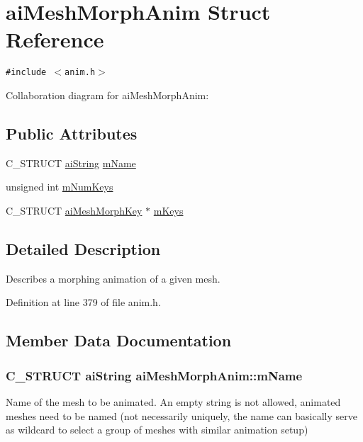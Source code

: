 \hypertarget{structai_mesh_morph_anim}{
\section{aiMeshMorphAnim Struct Reference}
\label{structai_mesh_morph_anim}
}
{\tt \#include $<$anim.h$>$}

Collaboration diagram for aiMeshMorphAnim:\subsection*{Public Attributes}
\begin{CompactItemize}
\item 
C\_\-STRUCT \hyperlink{structai_string}{aiString} \hyperlink{structai_mesh_morph_anim_21de91fb9c9fcf58a0bd0c761ea25cf5}{mName}
\item 
unsigned int \hyperlink{structai_mesh_morph_anim_f9c8a3e37613a196ed33d2746cf6f0c8}{mNumKeys}
\item 
C\_\-STRUCT \hyperlink{structai_mesh_morph_key}{aiMeshMorphKey} $\ast$ \hyperlink{structai_mesh_morph_anim_0d4f98ee7eb4e2aaabf31eba48bd14c2}{mKeys}
\end{CompactItemize}


\subsection{Detailed Description}
Describes a morphing animation of a given mesh. 

Definition at line 379 of file anim.h.

\subsection{Member Data Documentation}
\hypertarget{structai_mesh_morph_anim_21de91fb9c9fcf58a0bd0c761ea25cf5}{
\subsubsection[mName]{\setlength{\rightskip}{0pt plus 5cm}C\_\-STRUCT {\bf aiString} {\bf aiMeshMorphAnim::mName}}}
\label{structai_mesh_morph_anim_21de91fb9c9fcf58a0bd0c761ea25cf5}


Name of the mesh to be animated. An empty string is not allowed, animated meshes need to be named (not necessarily uniquely, the name can basically serve as wildcard to select a group of meshes with similar animation setup) 

